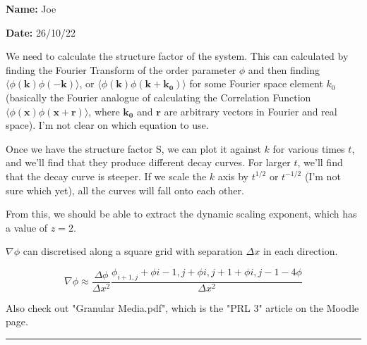 \documentclass{article}
\begin{document}
\textbf{Name:} Joe

\textbf{Date:} 26/10/22

\bigskip

We need to calculate the structure factor of the system. This can calculated by finding the Fourier Transform of the order parameter $\phi$ and then finding $\langle \phi(\boldsymbol{k})\phi(\boldsymbol{-k})\rangle$, or $\langle \phi(\boldsymbol{k})\phi(\boldsymbol{k}+\boldsymbol{k_{0}})\rangle$ for some Fourier space element $k_{0}$ (basically the Fourier analogue of calculating the Correlation Function $\langle\phi(\boldsymbol{x})\phi(\boldsymbol{x}+\boldsymbol{r})\rangle$, where $\boldsymbol{k_{0}}$ and $\boldsymbol{r}$ are arbitrary vectors in Fourier and real space). I'm not clear on which equation to use.

\medskip

Once we have the structure factor S, we can plot it against $k$ for various times $t$, and we'll find that they produce different decay curves. For larger $t$, we'll find that the decay curve is steeper. If we scale the $k$ axis by $t^{1/2}$ or $t^{-1/2}$ (I'm not sure which yet), all the curves will fall onto each other.



From this, we should be able to extract the dynamic scaling exponent, which has a value of $z=2$.

\medskip

$\nabla\phi$ can discretised along a square grid with separation $\Delta x$ in each direction.

\begin{equation}
	\nabla \phi \approx \frac{\Delta \phi}{\Delta x^{2}} \frac{\phi_{i+1,j} + \phi{i-1,j} + \phi{i,j+1} + \phi{i,j-1}-4\phi}{\Delta x^{2}}
\end{equation}

\medskip

Also check out "Granular Media.pdf", which is the "PRL 3" article on the Moodle page.

\medskip

\rule{\textwidth}{0.4pt}
\end{document}
